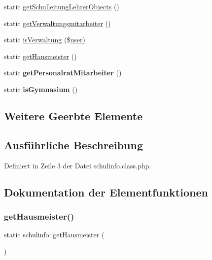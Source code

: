 \begin{DoxyCompactItemize}
static \mbox{\hyperlink{classschulinfo_a151fa5931f4f317b6717f7238e9222ad}{get\+Schulleitung\+Lehrer\+Objects}} ()
\item 
static \mbox{\hyperlink{classschulinfo_a49649eb2eea39adfd114e1b793b935d1}{get\+Verwaltungsmitarbeiter}} ()
\item 
static \mbox{\hyperlink{classschulinfo_ac588329bc290b4133b8c6f4f2e040c3f}{is\+Verwaltung}} (\$\mbox{\hyperlink{classuser}{user}})
\item 
static \mbox{\hyperlink{classschulinfo_add0d7e63931491f656b6af8fe954fd63}{get\+Hausmeister}} ()
\item 
\mbox{\label{classschulinfo_a859d66436697f3d93175418c4aef1008}} 
static {\bfseries get\+Personalrat\+Mitarbeiter} ()
\item 
\mbox{\label{classschulinfo_a0a1f94647a018e98eab965976217afdc}} 
static {\bfseries is\+Gymnasium} ()
\end{DoxyCompactItemize}
\subsection*{Weitere Geerbte Elemente}


\subsection{Ausführliche Beschreibung}


Definiert in Zeile 3 der Datei schulinfo.\+class.\+php.



\subsection{Dokumentation der Elementfunktionen}
\mbox{\label{classschulinfo_add0d7e63931491f656b6af8fe954fd63}} 
\subsubsection{\texorpdfstring{get\+Hausmeister()}{getHausmeister()}}
{\footnotesize\ttfamily static schulinfo\+::get\+Hausmeister (\begin{DoxyParamCaption}{ }\end{DoxyParamCaption})\hspace{0.3cm}{\ttfamily [static]}}

